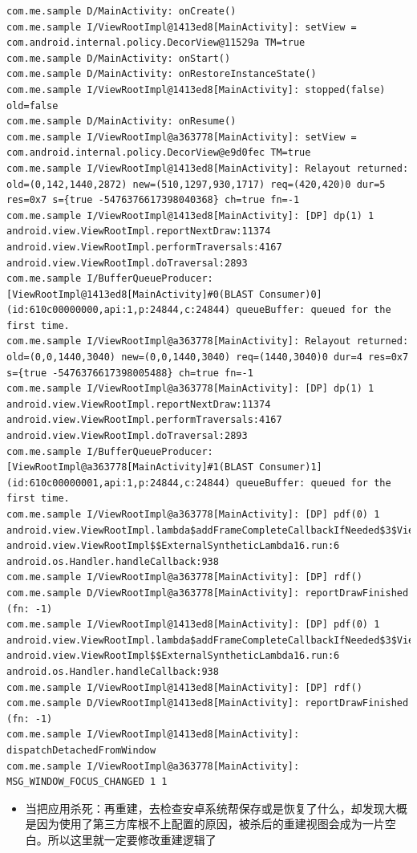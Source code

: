 \documentclass[9pt, b5paper]{article}
\begin{document}
\begin{verbatim}
com.me.sample D/MainActivity: onCreate() 
com.me.sample I/ViewRootImpl@1413ed8[MainActivity]: setView = com.android.internal.policy.DecorView@11529a TM=true
com.me.sample D/MainActivity: onStart() 
com.me.sample D/MainActivity: onRestoreInstanceState() 
com.me.sample I/ViewRootImpl@1413ed8[MainActivity]: stopped(false) old=false
com.me.sample D/MainActivity: onResume() 
com.me.sample I/ViewRootImpl@a363778[MainActivity]: setView = com.android.internal.policy.DecorView@e9d0fec TM=true
com.me.sample I/ViewRootImpl@1413ed8[MainActivity]: Relayout returned: old=(0,142,1440,2872) new=(510,1297,930,1717) req=(420,420)0 dur=5 res=0x7 s={true -5476376617398040368} ch=true fn=-1
com.me.sample I/ViewRootImpl@1413ed8[MainActivity]: [DP] dp(1) 1 android.view.ViewRootImpl.reportNextDraw:11374 android.view.ViewRootImpl.performTraversals:4167 android.view.ViewRootImpl.doTraversal:2893 
com.me.sample I/BufferQueueProducer: [ViewRootImpl@1413ed8[MainActivity]#0(BLAST Consumer)0](id:610c00000000,api:1,p:24844,c:24844) queueBuffer: queued for the first time.
com.me.sample I/ViewRootImpl@a363778[MainActivity]: Relayout returned: old=(0,0,1440,3040) new=(0,0,1440,3040) req=(1440,3040)0 dur=4 res=0x7 s={true -5476376617398005488} ch=true fn=-1
com.me.sample I/ViewRootImpl@a363778[MainActivity]: [DP] dp(1) 1 android.view.ViewRootImpl.reportNextDraw:11374 android.view.ViewRootImpl.performTraversals:4167 android.view.ViewRootImpl.doTraversal:2893 
com.me.sample I/BufferQueueProducer: [ViewRootImpl@a363778[MainActivity]#1(BLAST Consumer)1](id:610c00000001,api:1,p:24844,c:24844) queueBuffer: queued for the first time.
com.me.sample I/ViewRootImpl@a363778[MainActivity]: [DP] pdf(0) 1 android.view.ViewRootImpl.lambda$addFrameCompleteCallbackIfNeeded$3$ViewRootImpl:4969 android.view.ViewRootImpl$$ExternalSyntheticLambda16.run:6 android.os.Handler.handleCallback:938 
com.me.sample I/ViewRootImpl@a363778[MainActivity]: [DP] rdf()
com.me.sample D/ViewRootImpl@a363778[MainActivity]: reportDrawFinished (fn: -1) 
com.me.sample I/ViewRootImpl@1413ed8[MainActivity]: [DP] pdf(0) 1 android.view.ViewRootImpl.lambda$addFrameCompleteCallbackIfNeeded$3$ViewRootImpl:4969 android.view.ViewRootImpl$$ExternalSyntheticLambda16.run:6 android.os.Handler.handleCallback:938 
com.me.sample I/ViewRootImpl@1413ed8[MainActivity]: [DP] rdf()
com.me.sample D/ViewRootImpl@1413ed8[MainActivity]: reportDrawFinished (fn: -1) 
com.me.sample I/ViewRootImpl@1413ed8[MainActivity]: dispatchDetachedFromWindow
com.me.sample I/ViewRootImpl@a363778[MainActivity]: MSG_WINDOW_FOCUS_CHANGED 1 1
\end{verbatim}
\begin{itemize}
\item 当把应用杀死：再重建，去检查安卓系统帮保存或是恢复了什么，却发现大概是因为使用了第三方库根不上配置的原因，被杀后的重建视图会成为一片空白。所以这里就一定要修改重建逻辑了
\end{itemize}
\end{document}
